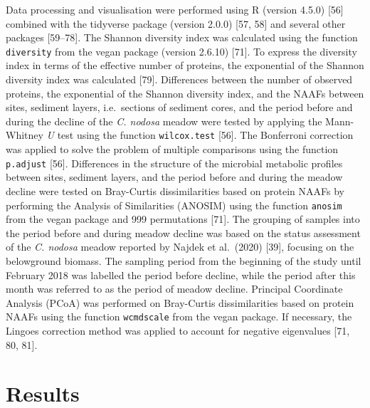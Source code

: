 \documentclass[
  12 pt,
]{article}
\begin{document}
Data processing and visualisation were performed using R (version 4.5.0) {[}56{]} combined with the tidyverse package (version 2.0.0) {[}57, 58{]} and several other packages {[}59--78{]}. The Shannon diversity index was calculated using the function \texttt{diversity} from the vegan package (version 2.6.10) {[}71{]}. To express the diversity index in terms of the effective number of proteins, the exponential of the Shannon diversity index was calculated {[}79{]}. Differences between the number of observed proteins, the exponential of the Shannon diversity index, and the NAAFs between sites, sediment layers, i.e.~sections of sediment cores, and the period before and during the decline of the \emph{C. nodosa} meadow were tested by applying the Mann-Whitney \emph{U} test using the function \texttt{wilcox.test} {[}56{]}. The Bonferroni correction was applied to solve the problem of multiple comparisons using the function \texttt{p.adjust} {[}56{]}. Differences in the structure of the microbial metabolic profiles between sites, sediment layers, and the period before and during the meadow decline were tested on Bray-Curtis dissimilarities based on protein NAAFs by performing the Analysis of Similarities (ANOSIM) using the function \texttt{anosim} from the vegan package and 999 permutations {[}71{]}. The grouping of samples into the period before and during meadow decline was based on the status assessment of the \emph{C. nodosa} meadow reported by Najdek et al.~(2020) {[}39{]}, focusing on the belowground biomass. The sampling period from the beginning of the study until February 2018 was labelled the period before decline, while the period after this month was referred to as the period of meadow decline. Principal Coordinate Analysis (PCoA) was performed on Bray-Curtis dissimilarities based on protein NAAFs using the function \texttt{wcmdscale} from the vegan package. If necessary, the Lingoes correction method was applied to account for negative eigenvalues {[}71, 80, 81{]}.

\newpage

\hypertarget{results}{%
\section{Results}\label{results}}
\end{document}
